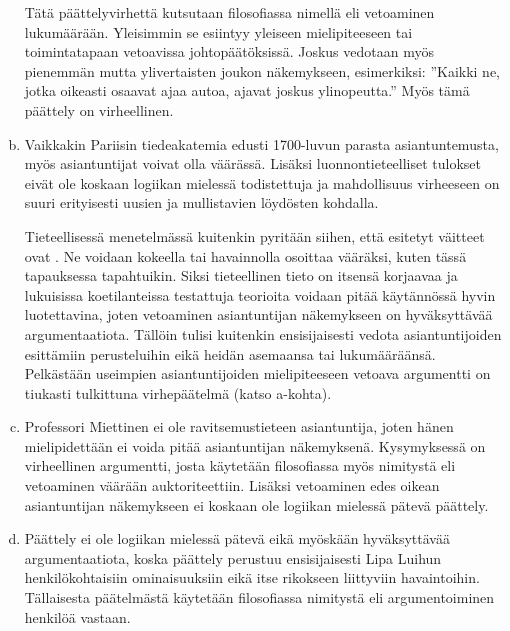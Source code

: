 \begin{esimerkki}
\begin{enumerate}[a)]
                Tätä päättelyvirhettä kutsutaan filosofiassa nimellä 
                eli vetoaminen lukumäärään.
                Yleisimmin se esiintyy yleiseen mielipiteeseen tai toimintatapaan vetoavissa johtopäätöksissä.
                Joskus vedotaan myös pienemmän mutta ylivertaisten joukon näkemykseen, esimerkiksi:
                ''Kaikki ne, jotka oikeasti osaavat ajaa autoa, ajavat joskus ylinopeutta.''
                Myös tämä päättely on virheellinen.
            \item Vaikkakin Pariisin tiedeakatemia edusti 1700-luvun parasta asiantuntemusta, myös asiantuntijat
                voivat olla väärässä.
                Lisäksi luonnontieteelliset tulokset eivät ole koskaan logiikan mielessä todistettuja ja mahdollisuus 
                virheeseen on suuri erityisesti uusien ja mullistavien löy\-dös\-ten kohdalla.
                
                Tieteellisessä menetelmässä kuitenkin pyritään siihen, että esitetyt väitteet ovat 
                .
                Ne voidaan kokeella tai havainnolla osoittaa vääräksi, kuten tässä tapauksessa tapahtuikin.
                Siksi tieteellinen tieto on itsensä korjaavaa ja lukuisissa koetilanteissa testattuja teorioita
                voidaan pitää käytännössä hyvin luotettavina, joten vetoaminen asiantuntijan näkemykseen on hyväksyttävää 
                argumentaatiota.
                Tällöin tulisi kuitenkin ensisijaisesti vedota asiantuntijoiden esittämiin perusteluihin eikä
                heidän asemaansa tai lukumääräänsä.
                Pelkästään useimpien asiantuntijoiden mielipiteeseen vetoava argumentti on tiukasti
                tulkittuna virhepäätelmä (katso a-kohta).
            \item Professori Miettinen ei ole ravitsemustieteen asiantuntija, joten hänen mielipidettään ei voida pitää 
                asiantuntijan näkemyksenä.
                Kysymyksessä on virheellinen argumentti, josta käytetään filosofiassa myös nimitystä
                 eli vetoaminen väärään auktoriteettiin.
                Lisäksi vetoaminen edes oikean asiantuntijan näkemykseen ei koskaan ole logiikan mielessä pätevä päättely.
            \item Päättely ei ole logiikan mielessä pätevä eikä myöskään hy\-väk\-syt\-tä\-vää argumentaatiota,
                koska  päättely perustuu ensisijaisesti Lipa Luihun henkilökohtaisiin ominaisuuksiin eikä itse
                rikokseen liittyviin havaintoihin. Tällaisesta päätelmästä käytetään filosofiassa nimitystä 
                 eli argumentoiminen henkilöä vastaan.
                

\end{enumerate}
\end{esimerkki}
